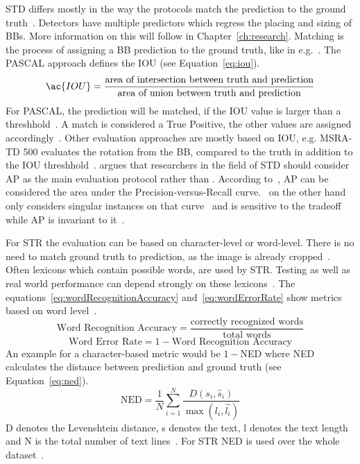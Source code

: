 \ac{STD} differs mostly in the way the protocols match the prediction to the ground
truth~\citep{long_scene_2021}.
Detectors have multiple predictors which regress the placing and sizing of \acp{BB}.
More information on this will follow in Chapter~\ref{ch:research}.
Matching is the process of assigning a \ac{BB} prediction to the ground
truth, like in e.g.~\cite{liu_ssd_2016,liao_textboxes_2018}.
The PASCAL approach defines the \ac{IOU} (see Equation~\ref{eq:iou}).
\begin{equation}\label{eq:iou}
    \ac{IOU}=
            \frac{\text{area of intersection between truth and prediction}}{\text{area of union
            between truth and prediction}}
\end{equation}
For PASCAL, the prediction will be matched, if the \ac{IOU} value is larger than a
threshhold~\citep{long_scene_2021}.
A match is considered a True Positive, the other values are assigned
accordingly~\citep{sun_icdar_2019}.
Other evaluation approaches are mostly based on \ac{IOU}, e.g. MSRA-TD 500 evaluates the rotation
from the \ac{BB}, compared to the truth in addition to the \ac{IOU}
threshhold~\citep{long_scene_2021}.
\cite{long_scene_2021} argues that researchers in the field of \ac{STD} should consider \ac{AP}
as the main evaluation protocol rather than \fone.
According to~\cite{su_relationship_2015}, \ac{AP} can be considered the area under the
Precision-versus-Recall curve.
\fone\ on the other hand only considers singular instances on that curve~\citep{long_scene_2021} and
is sensitive to the tradeoff while \ac{AP} is invariant to it~\citep{shi_icdar2017_2017}.

For \ac{STR} the evaluation can be based on character-level or word-level.
There is no need to match ground truth to prediction, as the image is already
cropped~\citep{long_scene_2021}.
Often lexicons which contain possible words, are used by \ac{STR}.
Testing as well as real world performance can depend strongly on these
lexicons~\citep{chen_text_2021,long_scene_2021}.
The equations~\ref{eq:wordRecognitionAccuracy} and~\ref{eq:wordErrorRate} show metrics based on
word level~\citep{chen_text_2021}.
\begin{equation}\label{eq:wordRecognitionAccuracy}
\text{Word Recognition Accuracy} = \frac{\text{correctly recognized words}}{\text{total words}}
\end{equation}
\begin{equation}\label{eq:wordErrorRate}
    \text{Word Error Rate} = 1 - \text{Word Recognition Accuracy}
\end{equation}
An example for a character-based metric would be $1 - $NED where \ac{NED}
calculates the distance between prediction and ground truth (see Equation~\ref{eq:ned}).
\begin{equation}\label{eq:ned}
    \text{NED} = \frac{1}{N}\sum_{i=1}^N \frac{D(s_i,\hat{s}_i)}{\max(l_i,\hat{l_i})}
\end{equation}
D denotes the Levenshtein distance, s denotes the text, l denotes the text length and N is the total
number of text lines~\citep{shi_icdar2017_2017}.
For \ac{STR} \ac{NED} is used over the whole dataset~\citep{karatzas_icdar_2013}.

